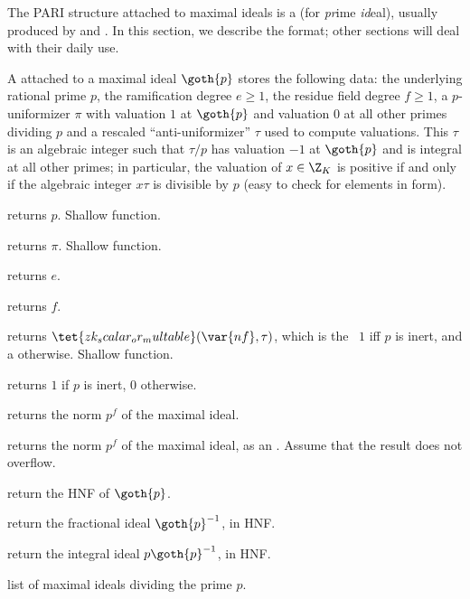 


The PARI structure attached to maximal ideals is a  (for
\emph{pr}ime \emph{id}eal), usually produced by 
and . In this section, we describe the format; other sections
will deal with their daily use.

A  attached to a maximal ideal $\goth{p}$ stores the following
data: the underlying rational prime $p$, the ramification degree $e\geq 1$,
the residue field degree $f\geq 1$, a $p$-uniformizer $\pi$ with valuation
$1$ at $\goth{p}$ and valuation $0$ at all other primes dividing $p$ and
a rescaled ``anti-uniformizer'' $\tau$ used to compute valuations. This
$\tau$ is an algebraic integer such that $\tau/p$ has valuation $-1$ at
$\goth{p}$ and is integral at all other primes; in particular,
the valuation of $x\in\Z_K$ is positive if and only if the algebraic integer
$x\tau$ is divisible by $p$ (easy to check for elements in  form).

 returns $p$. Shallow function.

 returns $\pi$. Shallow function.

 returns $e$.

 returns $f$.

 returns
$\tet{zk_scalar_or_multable}(\var{nf}, \tau)$, which is the ~$1$
iff $p$ is inert, and a  otherwise. Shallow function.

 returns $1$ if $p$ is inert, $0$ otherwise.

 returns the norm $p^f$ of the maximal ideal.

 returns the norm $p^f$ of the maximal ideal, as
an . Assume that the result does not overflow.

 return the HNF of $\goth{p}$.

 return the fractional ideal $\goth{p}^{-1}$, in HNF.

 return the integral ideal $p \goth{p}^{-1}$, in HNF.

 list of maximal ideals dividing the
prime $p$.

